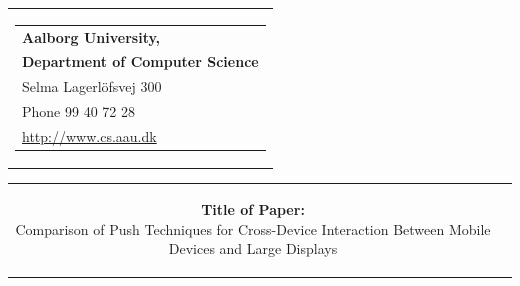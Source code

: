 


\begin{nopagebreak}
{\samepage

\begin{tabular}{r}
	\parbox{\textwidth}
	{  
		\hspace{3.7cm} \parbox{0cm}
		{
			\begin{tabular}{l}
			{\small \textbf{Aalborg University,}}\\
			{\small \textbf{Department of Computer Science}}\\
			
			{\small Selma Lagerlöfsvej 300} \\
			{\small Phone 99 40 72 28} \\
			{\small \url{http://www.cs.aau.dk}}
			\end{tabular}
		}
		\vspace{0cm}
	}
\end{tabular}

\begin{tabular}{cc}
\parbox{8cm}{

\begin{description}

\item {\textbf{Title of Paper:}}\\ 
Comparison of Push Techniques for Cross-Device Interaction Between Mobile Devices and Large Displays

\end{description}

\parbox{8cm}{

}}
\end{tabular}}
\end{nopagebreak}
